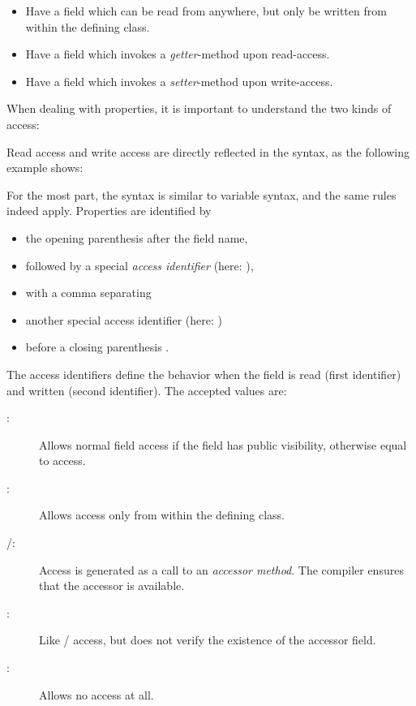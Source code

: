 \documentclass{haxe}
\begin{document}
\begin{itemize}
	\item Have a field which can be read from anywhere, but only be written from within the defining class.
	\item Have a field which invokes a \emph{getter}-method upon read-access.
	\item Have a field which invokes a \emph{setter}-method upon write-access.
\end{itemize}

When dealing with properties, it is important to understand the two kinds of access:



Read access and write access are directly reflected in the syntax, as the following example shows:


For the most part, the syntax is similar to variable syntax, and the same rules indeed apply. Properties are identified by

\begin{itemize}
	\item the opening parenthesis \expr{(} after the field name,
	\item followed by a special \emph{access identifier} (here: ),
	\item with a comma \expr{,} separating
	\item another special access identifier (here: )
	\item before a closing parenthesis \expr{)}.
\end{itemize}

The access identifiers define the behavior when the field is read (first identifier) and written (second identifier). The accepted values are:

\begin{description}
	\item[:] Allows normal field access if the field has public visibility, otherwise equal to  access.
	\item[:] Allows access only from within the defining class.
	\item[/:] Access is generated as a call to an \emph{accessor method}. The compiler ensures that the accessor is available.
	\item[:] Like / access, but does not verify the existence of the accessor field.
	\item[:] Allows no access at all.
\end{description}
\end{document}
